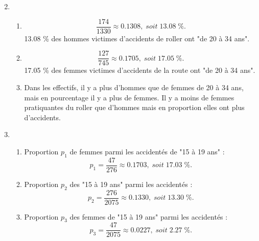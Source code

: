 \documentclass[xcolor={dvipsnames}]{beamer}
\begin{document}
\begin{frame}{}

\begin{enumerate}%
	\setcounter{enumi}{1}
	\item \begin{enumerate}[a]
		\item \begin{equation*}
		\dfrac{174}{1330} \approx \num{0.1308},\; soit \; \num{13.08}\; \%.
		\end{equation*}
		\num{13.08} \% des hommes victimes d'accidents de roller ont "de 20 à 34 ans".\pause
		
		\item \begin{equation*}
		\dfrac{127}{745} \approx \num{0.1705},\; soit \; \num{17.05}\; \%.
		\end{equation*}
		\num{17.05} \% des femmes victimes d'accidents de la route ont "de 20 à 34 ans".\pause
		
		\item Dans les effectifs, il y a plus d'hommes que de femmes de 20 à 34 ans, mais en pourcentage il y a plus de femmes. Il y a moins de femmes pratiquantes du roller que d'hommes mais en proportion elles ont plus d'accidents.
	\end{enumerate}
\end{enumerate}
\end{frame}


\begin{frame}{}

\begin{enumerate}%
	\setcounter{enumi}{2}
	\item \begin{enumerate}[a]
		\item Proportion $p_1$ de femmes parmi les accidentés de "15 à 19 ans" :
		\begin{equation*}
		p_1=\dfrac{47}{276}\approx \num{0.1703}, \; soit \; \num{17.03}\; \%.
		\end{equation*}\pause
		
		\item Proportion $p_2$ des "15 à 19 ans" parmi les accidentés :
		\begin{equation*}
		p_2=\dfrac{276}{2075} \approx \num{0.1330}, \; soit \; \num{13.30}\; \%.
		\end{equation*}\pause
		
		\item Proportion $p_3$ des femmes de "15 à 19 ans" parmi les accidentés :
		\begin{equation*}
		p_3 = \dfrac{47}{2075} \approx \num{0.0227}, \; soit \; \num{2.27} \; \%.
		\end{equation*}\pause
		
	
	
	
	\end{enumerate}
\end{enumerate}
\end{frame}
\end{document}
